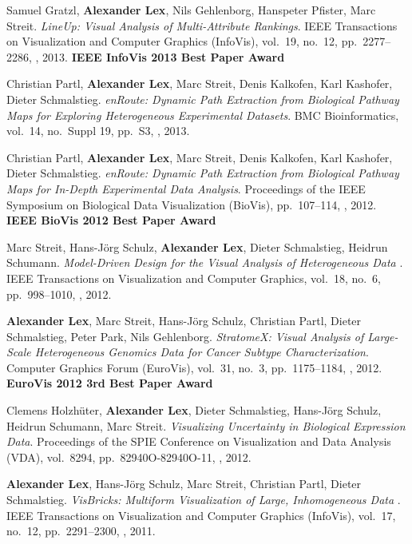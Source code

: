 \item Samuel Gratzl, \textbf{Alexander Lex}, Nils Gehlenborg, Hanspeter Pfister, Marc Streit. \textit{LineUp: Visual Analysis of Multi-Attribute Rankings}. IEEE Transactions on Visualization and Computer Graphics (InfoVis), vol.\ 19, no.\ 12, pp.\ 2277--2286, , 2013. \textbf{IEEE InfoVis 2013 Best Paper Award}
\item Christian Partl, \textbf{Alexander Lex}, Marc Streit, Denis Kalkofen, Karl Kashofer, Dieter Schmalstieg. \textit{enRoute: Dynamic Path Extraction from Biological Pathway Maps for Exploring Heterogeneous Experimental Datasets}. BMC Bioinformatics, vol.\ 14, no.\ Suppl 19, pp.\ S3, , 2013. 
\item Christian Partl, \textbf{Alexander Lex}, Marc Streit, Denis Kalkofen, Karl Kashofer, Dieter Schmalstieg. \textit{enRoute: Dynamic Path Extraction from Biological Pathway Maps for In-Depth Experimental Data Analysis}.  Proceedings of the IEEE Symposium on Biological Data Visualization (BioVis), pp.\ 107--114, , 2012. \textbf{IEEE BioVis 2012 Best Paper Award}
\item Marc Streit, Hans-Jörg Schulz, \textbf{Alexander Lex}, Dieter Schmalstieg, Heidrun Schumann. \textit{Model-Driven Design for the Visual Analysis of Heterogeneous Data }. IEEE Transactions on Visualization and Computer Graphics, vol.\ 18, no.\ 6, pp.\ 998--1010, , 2012. 
\item \textbf{Alexander Lex}, Marc Streit, Hans-Jörg Schulz, Christian Partl, Dieter Schmalstieg, Peter Park, Nils Gehlenborg. \textit{StratomeX: Visual Analysis of Large-Scale Heterogeneous Genomics Data for Cancer Subtype Characterization}. Computer Graphics Forum (EuroVis), vol.\ 31, no.\ 3, pp.\ 1175--1184, , 2012. \textbf{EuroVis 2012 3rd Best Paper Award}
\item Clemens Holzhüter, \textbf{Alexander Lex}, Dieter Schmalstieg, Hans-Jörg Schulz, Heidrun Schumann, Marc Streit. \textit{Visualizing Uncertainty in Biological Expression Data}.  Proceedings of the SPIE Conference on Visualization and Data Analysis (VDA), vol.\ 8294, pp.\ 82940O-82940O-11, , 2012. 
\item \textbf{Alexander Lex}, Hans-Jörg Schulz, Marc Streit, Christian Partl, Dieter Schmalstieg. \textit{VisBricks: Multiform Visualization of Large, Inhomogeneous Data }. IEEE Transactions on Visualization and Computer Graphics (InfoVis), vol.\ 17, no.\ 12, pp.\ 2291--2300, , 2011. 

